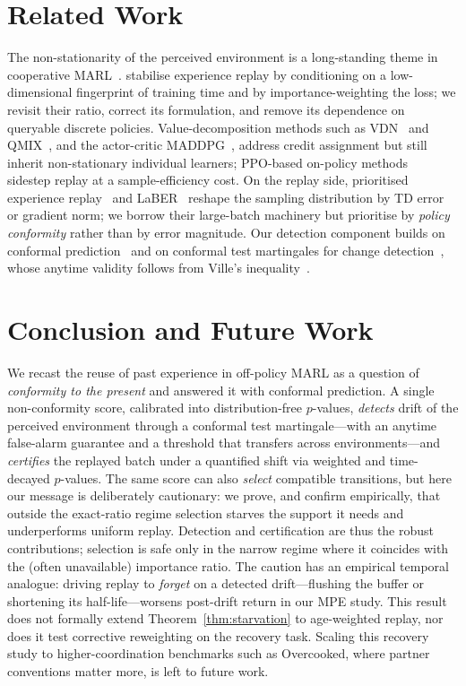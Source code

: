 \documentclass[sigconf]{aamas}
\begin{document}
\section{Related Work}
The non-stationarity of the perceived environment is a long-standing theme in
cooperative MARL~\cite{matignon2012independent}. \citet{foerster2017stabilising}
stabilise experience replay by conditioning on a low-dimensional fingerprint of
training time and by importance-weighting the loss; we revisit their ratio,
correct its formulation, and remove its dependence on queryable discrete
policies. Value-decomposition methods such as
VDN~\cite{sunehag2018value} and QMIX~\cite{rashid2018qmix}, and the actor-critic
MADDPG~\cite{lowe2017multi}, address credit assignment but still inherit
non-stationary individual learners; PPO-based on-policy
methods~\cite{yu2022surprising} sidestep replay at a sample-efficiency cost.
On the replay side, prioritised experience
replay~\cite{schaul2016prioritized} and LaBER~\cite{lahire2022large} reshape the
sampling distribution by TD error or gradient norm; we borrow their
large-batch machinery but prioritise by \emph{policy conformity} rather than by
error magnitude. Our detection component builds on conformal
prediction~\cite{vovk2005algorithmic,angelopoulos2023gentle} and on conformal
test martingales for change
detection~\cite{vovk2003testing,volkhonskiy2017inductive}, whose anytime validity
follows from Ville's inequality~\cite{ville1939etude,ramdas2023gametheoretic}.

\section{Conclusion and Future Work}
\label{sec:conclusion}
We recast the reuse of past experience in off-policy MARL as a question of
\emph{conformity to the present} and answered it with conformal prediction. A
single non-conformity score, calibrated into distribution-free $p$-values,
\emph{detects} drift of the perceived environment through a conformal test
martingale---with an anytime false-alarm guarantee and a threshold that transfers
across environments---and \emph{certifies} the replayed batch under a quantified
shift via weighted and time-decayed $p$-values. The same score can also
\emph{select} compatible transitions, but here our message is deliberately
cautionary: we prove, and confirm empirically, that outside the exact-ratio
regime selection starves the support it needs and underperforms uniform replay.
Detection and certification are thus the robust contributions; selection is safe
only in the narrow regime where it coincides with the (often unavailable)
importance ratio. The caution has an empirical temporal analogue: driving replay to
\emph{forget} on a detected drift---flushing the buffer or shortening its half-life---worsens
post-drift return in our MPE study. This result does not formally
extend Theorem~\ref{thm:starvation} to age-weighted replay, nor does it test corrective
reweighting on the recovery task. Scaling this
recovery study to higher-coordination benchmarks such as Overcooked, where partner
conventions matter more, is left to future work.
\end{document}
